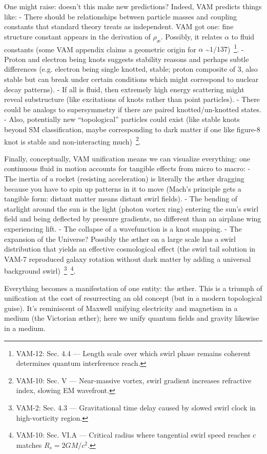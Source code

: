 \documentclass[a4paper,12pt]{article}
\begin{document}
    One might raise: doesn’t this make new predictions? Indeed, VAM predicts things like:
    - There should be relationships between particle masses and coupling constants that standard theory treats as independent. VAM got one: fine structure constant appears in the derivation of $\rho_{\text{\ae}}$. Possibly, it relates $\alpha$ to fluid constants (some VAM appendix claims a geometric origin for $\alpha$ \textasciitilde $1/137$)~\footnote{VAM-12: Sec. 4.4 — Length scale over which swirl phase remains coherent determines quantum interference reach.}.
    - Proton and electron being knots suggests stability reasons and perhaps subtle differences (e.g. electron being single knotted, stable; proton composite of 3, also stable but can break under certain conditions which might correspond to nuclear decay patterns).
    - If all is fluid, then extremely high energy scattering might reveal substructure (like excitations of knots rather than point particles).
    - There could be analogs to supersymmetry if there are paired knotted/un-knotted states.
    - Also, potentially new “topological” particles could exist (like stable knots beyond SM classification, maybe corresponding to dark matter if one like figure-8 knot is stable and non-interacting much)~\footnote{VAM-10: Sec. V — Near-massive vortex, swirl gradient increases refractive index, slowing EM wavefront.}.

    Finally, conceptually, VAM unification means we can visualize everything: one continuous fluid in motion accounts for tangible effects from micro to macro:
    - The inertia of a rocket (resisting acceleration) is literally the æther dragging because you have to spin up patterns in it to move (Mach’s principle gets a tangible form: distant matter means distant swirl fields).
    - The bending of starlight around the sun is the light (photon vortex ring) entering the sun’s swirl field and being deflected by pressure gradients, no different than an airplane wing experiencing lift.
    - The collapse of a wavefunction is a knot snapping.
    - The expansion of the Universe? Possibly the æther on a large scale has a swirl distribution that yields an effective cosmological effect (the swirl tail solution in VAM-7 reproduced galaxy rotation without dark matter by adding a universal background swirl)~\footnote{VAM-2: Sec. 4.3 — Gravitational time delay caused by slowed swirl clock in high-vorticity region.}~\footnote{VAM-10: Sec. VI.A — Critical radius where tangential swirl speed reaches $c$ matches $R_s = 2GM/c^2$.}.

    Everything becomes a manifestation of one entity: the æther. This is a triumph of unification at the cost of resurrecting an old concept (but in a modern topological guise). It’s reminiscent of Maxwell unifying electricity and magnetism in a medium (the Victorian æther); here we unify quantum fields and gravity likewise in a medium.
\end{document}
